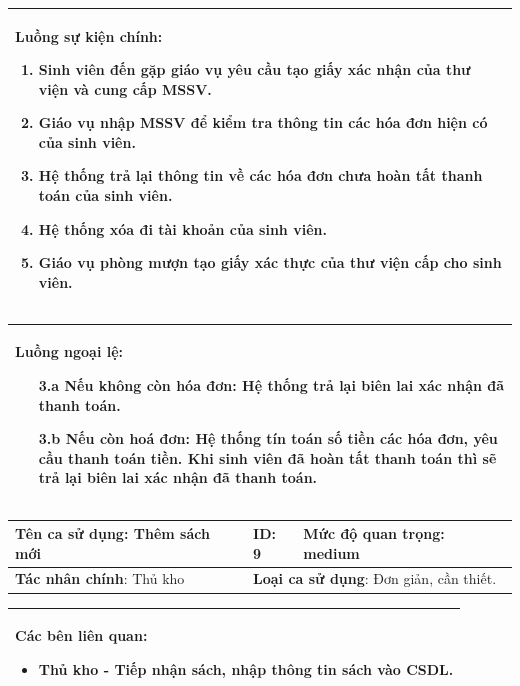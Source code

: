 \documentclass[../report.tex]{subfiles}
\begin{document}
\begin{center}
\begin{tabular}{| m{15.9cm} |}
    \hline
    \textbf{Luồng sự kiện chính}:
    \begin{enumerate}
        \item Sinh viên đến gặp giáo vụ yêu cầu tạo giấy xác nhận của thư viện và cung cấp MSSV. 
        \item Giáo vụ nhập MSSV để kiểm tra thông tin các hóa đơn hiện có của sinh viên. 
        \item Hệ thống trả lại thông tin về các hóa đơn chưa hoàn tất thanh toán của sinh viên. 
        \item Hệ thống xóa đi tài khoản của sinh viên. 
        \item Giáo vụ phòng mượn tạo giấy xác thực của thư viện cấp cho sinh viên. 
    \end{enumerate} \\
    \hline
\end{tabular}

\begin{tabular}{| m{15.9cm} |}
    \hline
    \textbf{Luồng ngoại lệ}:
    \begin{enumerate}
        \item[3.a] Nếu không còn hóa đơn: Hệ thống trả lại biên lai xác nhận đã thanh toán. 
        \item[3.b] Nếu còn hoá đơn: Hệ thống tín toán số tiền các hóa đơn, yêu cầu thanh toán tiền. Khi sinh viên đã hoàn tất thanh toán thì sẽ 
            trả lại biên lai xác nhận đã thanh toán. 
    \end{enumerate} \\
    \hline
\end{tabular}

\newpage
\begin{tabular}{| m{6cm} | m{3cm} | m{6cm} |}
    \hline
    \textbf{Tên ca sử dụng}: Thêm sách mới & \textbf{ID}: 9 & \textbf{Mức độ quan trọng}: medium \\
    \hline
    \textbf{Tác nhân chính}: Thủ kho & \multicolumn{2}{|l|}{\textbf{Loại ca sử dụng}: Đơn giản, cần thiết.} \\
    \hline
\end{tabular}
\begin{tabular}{| m{15.9cm} |}
    \hline
        \textbf{Các bên liên quan:} 
        \begin{itemize}
            \item Thủ kho - Tiếp nhận sách, nhập thông tin sách vào CSDL. 
        \end{itemize} \\
    \hline
\end{tabular}


\end{center}
\end{document}
